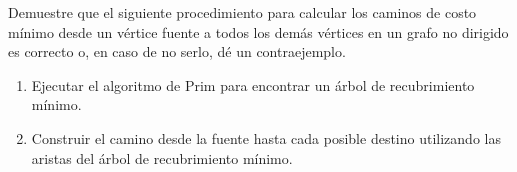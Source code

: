 
Demuestre que el siguiente procedimiento para calcular los caminos de costo mínimo desde un vértice fuente a todos los demás vértices en un grafo no dirigido es correcto o, en caso de no serlo, dé un contraejemplo.

\begin{enumerate}
  \item Ejecutar el algoritmo de Prim para encontrar un árbol de recubrimiento mínimo.
  \item Construir el camino desde la fuente hasta cada posible destino utilizando las aristas del árbol de recubrimiento mínimo.
\end{enumerate}

